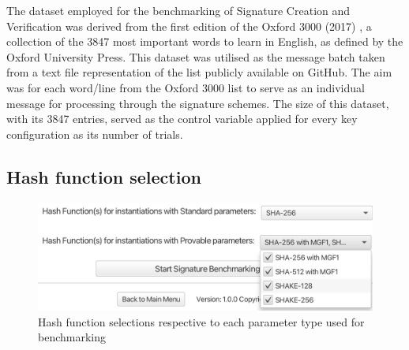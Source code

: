 \documentclass[]{final_report}
\theoremstyle{definition}
\begin{document}
The dataset employed for the benchmarking of Signature Creation and Verification was derived from the first edition of the Oxford 3000 (2017) \cite{Oxford3000_2022}, a collection of the 3847 most important words to learn in English, as defined by the Oxford University Press. This dataset was utilised as the message batch taken from a text file representation of the list \cite{Oxford3000_GitHub} publicly available on GitHub. The aim was for each word/line from the Oxford 3000 list to serve as an individual message for processing through the signature schemes. The size of this dataset, with its 3847 entries, served as the control variable applied for every key configuration as its number of trials. 

\subsection{Hash function selection}

\begin{figure}[H]
    \centering 
    \includegraphics[width=\textwidth]{main_pictures/ui/hashChoices.png}
    \caption{Hash function selections respective to each parameter type used for benchmarking}
\end{figure}
\end{document}
